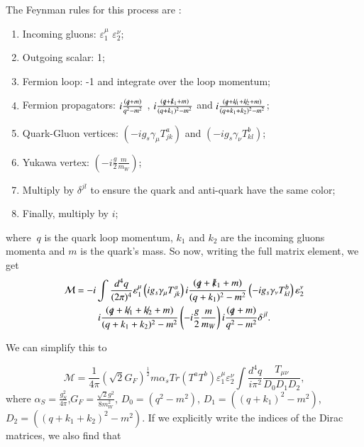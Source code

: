 \documentclass[EPJ,twocolumn]{webofc}
\begin{document}
The Feynman rules for this process are :

\begin{enumerate}
    \item Incoming gluons: $\varepsilon_1^{\mu}$ $\varepsilon_2^{\nu}$;
    \item Outgoing scalar: 1;
    \item Fermion loop: -1 and integrate over the loop momentum;
    \item Fermion propagators: $i\frac{(\slashed{q}+m)}{q^2-m^2}$ ,  $i\frac{(\slashed{q}+\slashed{k}_1+m)}{(q+k_1)^2-m^2}$ and $i\frac{(\slashed{q}+\slashed{k_1}+\slashed{k_2}+m)}{(q+k_1+k_2)^2-m^2}$;
    \item Quark-Gluon vertices: $\left( -ig_s\gamma_{\mu}T^a_{jk} \right)$ and  $\left( -ig_s\gamma_{\nu}T^b_{kl} \right)$;
    \item Yukawa vertex: $\left(-i\frac{g}{2}\frac{m}{m_W}\right)$;
    \item Multiply by $\delta^{jl}$ to ensure the quark and anti-quark have the same color;
    \item Finally, multiply by $i$;
\end{enumerate}
where $~q$ is the quark loop momentum, $k_1$ and $k_2$ are the incoming gluons momenta and $m$ is the quark's mass.
So now, writing the full matrix element, we get
\begin{multline}
    \mathcal{M} = -i\int \frac{d^4q}{(2\pi)^4} \varepsilon_1^{\mu}\left( ig_s\gamma_{\mu}T^a_{jk} \right)i\frac{(\slashed{q}+\slashed{k}_1+m)}{(q+k_1)^2-m^2}\left( -ig_s\gamma_{\nu}T^b_{kl} \right)\varepsilon_2^{\nu}\\ i\frac{(\slashed{q}+\slashed{k_1}+\slashed{k_2}+m)}{(q+k_1+k_2)^2-m^2}\left(-i\frac{g}{2}\frac{m}{m_W}\right)i\frac{(\slashed{q}+m)}{q^2-m^2}\delta^{jl}.
\end{multline}

We can simplify this to

\begin{equation}
   \mathcal{M} = \frac{1}{4\pi}\left(\sqrt{2}G_F\right)^{\frac{1}{2}}m\alpha_sTr\left(T^aT^b\right)\varepsilon_1^{\mu}\varepsilon_2^{\nu}\int \frac{d^4q}{i\pi^2}\frac{T_{\mu\nu}}{D_0D_1D_2},
\end{equation}
where $\alpha_S = \frac{g_S^2}{4\pi}$,$G_F = \frac{\sqrt{2}g^2}{8m_W^2}$, $D_0  = \left(q^2-m^2\right)$, $D_1  = \left((q+k_1)^2-m^2\right)$, $D_2  = \left((q+k_1+k_2)^2-m^2\right)$. If we explicitly write the indices of the Dirac matrices, we also find that
\end{document}
